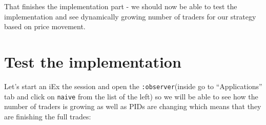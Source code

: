 \documentclass[
]{book}
\begin{document}
That finishes the implementation part - we should now be able to test the implementation and see dynamically growing number of traders for our strategy based on price movement.

\hypertarget{test-the-implementation-2}{%
\section{Test the implementation}\label{test-the-implementation-2}}

Let's start an iEx the session and open the \texttt{:observer}(inside go to ``Applications'' tab and click on \texttt{naive} from the list of the left) so we will be able to see how the number of traders is growing as well as PIDs are changing which means that they are finishing the full trades:
\end{document}
